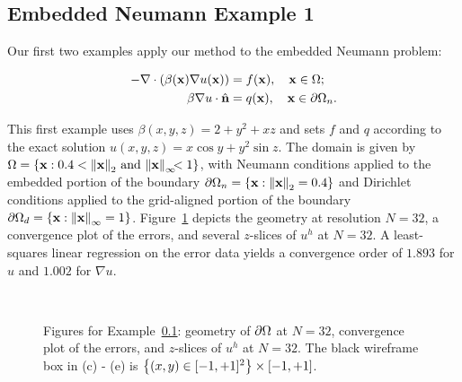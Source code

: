 \subsection{Embedded Neumann Example 1} \label{subsec:chap4.examples.neumann.1}

Our first two examples apply our method to the embedded Neumann problem:

\begin{align*}
-\nabla \cdot \left( \beta(\mathbf{x}) \nabla u(\mathbf{x}) \right) & = f(\mathbf{x}), \quad \mathbf{x} \in \Omega; \\
\beta \nabla u \cdot \hat{\mathbf{n}} & = q(\mathbf{x}), \quad \mathbf{x} \in \partial\Omega_n.
\end{align*}

This first example uses $\beta(x,y,z) = 2 + y^2 + xz$ and sets $f$ and $q$ according to the exact solution $u(x,y,z) = x \cos y + y^2 \sin z$. The domain is given by $\Omega = \left\lbrace  \mathbf{x} : 0.4 < \left\lVert \mathbf{x} \right\rVert_2 \, \text{and} \, \left\lVert \mathbf{x} \right\rVert_{\infty} \!\!\! < 1  \right\rbrace$, with Neumann conditions applied to the embedded portion of the boundary $\dOmega_n = \linebreak[4] \set{ \bfx : \norm{\bfx}_2 = 0.4 }$ and Dirichlet conditions applied to the grid-aligned portion of the boundary $\partial\Omega_d = \left\lbrace  \mathbf{x} : \left\lVert \mathbf{x} \right\rVert_{\infty} = 1  \right\rbrace$. Figure~\ref{fig:chap4.examples.neumann.1} depicts the geometry at resolution $N = 32$, a convergence plot of the errors, and several $z$-slices of $u^h$ at $N = 32$. A least-squares linear regression on the error data yields a convergence order of $1.893$ for $u$ and $1.002$ for $\nabla u$.

\setlength{\figureheighti}{0.30\textwidth}
\setlength{\figurewidthii}{0.33\textwidth}
\begin{figure}[htbp]
\centering
{}
 \\
\caption{Figures for Example~\ref{subsec:chap4.examples.neumann.1}: geometry of $\partial\Omega$ at $N = 32$, convergence plot of the errors, and $z$-slices of $u^h$ at $N = 32$. The black wireframe box in (c) - (e) is $\left\lbrace  (x,y) \in [-1,+1]^2  \right\rbrace \times [-1,+1]$.}
\label{fig:chap4.examples.neumann.1}
\end{figure}

